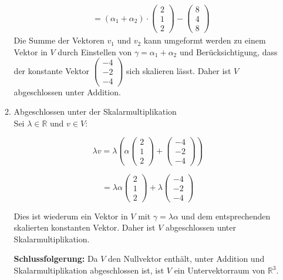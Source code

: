 \documentclass[a4paper]{scrartcl}
\begin{document}
\begin{enumerate}[label=\alph*)]
\begin{enumerate}[label=\alph*)]
\begin{align*}
    &= (\alpha_1 + \alpha_2) \cdot \begin{pmatrix} 2 \\ 1 \\ 2 \end{pmatrix} - \begin{pmatrix} 8 \\ 4 \\ 8 \end{pmatrix}
\end{align*}
Die Summe der Vektoren $v_1$ und $v_2$ kann umgeformt werden zu einem Vektor in $V$ durch Einstellen von $\gamma = \alpha_1 + \alpha_2$ und Berücksichtigung, dass der konstante Vektor $\begin{pmatrix} -4 \\ -2 \\ -4 \end{pmatrix}$ sich skalieren lässt. Daher ist $V$ abgeschlossen unter Addition.
\item Abgeschlossen unter der Skalarmultiplikation\\
Sei \(\lambda \in \mathbb{R}\) und \(v \in V\):

\[
\lambda v = \lambda \left( \alpha \begin{pmatrix} 2 \\ 1 \\ 2 \end{pmatrix} + \begin{pmatrix} -4 \\ -2 \\ -4 \end{pmatrix} \right)
\]

\[
= \lambda \alpha \begin{pmatrix} 2 \\ 1 \\ 2 \end{pmatrix} + \lambda \begin{pmatrix} -4 \\ -2 \\ -4 \end{pmatrix}
\]

Dies ist wiederum ein Vektor in \(V\) mit \(\gamma = \lambda \alpha\) und dem entsprechenden skalierten konstanten Vektor. Daher ist \(V\) abgeschlossen unter Skalarmultiplikation.

\textbf{Schlussfolgerung:} Da \(V\) den Nullvektor enthält, unter Addition und Skalarmultiplikation abgeschlossen ist, ist \(V\) ein Untervektorraum von \(\mathbb{R}^3\).
\end{enumerate}
\end{enumerate}
\end{document}
